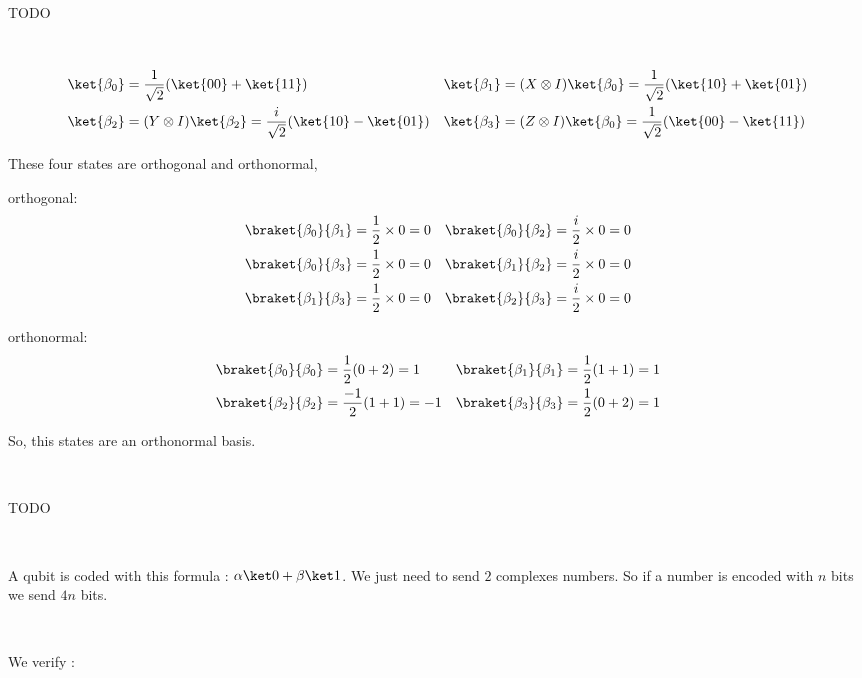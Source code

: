TODO

~

\begin{align*}
  \ket{\beta_0} &= \frac{1}{\sqrt 2}(\ket{00} + \ket{11})
  &\ket{\beta_1} &= (X \otimes I)\ket{\beta_0} =
    \frac{1}{\sqrt 2}(\ket{10}+\ket{01}) \\
  \ket{\beta_2} &= (Y \otimes I)\ket{\beta_2} =
    \frac{i}{\sqrt 2}(\ket{10} - \ket{01})
  &\ket{\beta_3} &= (Z \otimes I)\ket{\beta_0} =
    \frac{1}{\sqrt 2}(\ket{00}-\ket{11})
\end{align*}

These four states are orthogonal and orthonormal,

orthogonal:
\begin{align*}
  \braket{\beta_0}{\beta_1} &= \frac 1 2 \times 0 = 0 &
  \braket{\beta_0}{\beta_2} &= \frac i 2 \times 0 = 0 \\
  \braket{\beta_0}{\beta_3} &= \frac 1 2 \times 0 = 0 &
  \braket{\beta_1}{\beta_2} &= \frac i 2 \times 0 = 0 \\
  \braket{\beta_1}{\beta_3} &= \frac 1 2 \times 0 = 0 &
  \braket{\beta_2}{\beta_3} &= \frac i 2 \times 0 = 0
\end{align*}

orthonormal:
\begin{align*}
  \braket{\beta_0}{\beta_0} &= \frac 1 2 (0 + 2) = 1 &
  \braket{\beta_1}{\beta_1} &= \frac 1 2 (1 + 1) = 1 \\
  \braket{\beta_2}{\beta_2} &= \frac{-1}{2} (1 + 1) = -1 &
  \braket{\beta_3}{\beta_3} &= \frac 1 2 (0 + 2) = 1 \\
\end{align*}

So, this states are an orthonormal basis.

~

TODO

~

A qubit is coded with this formula : $\alpha \ket 0 + \beta \ket 1$.
We just need to send $2$ complexes numbers. So if a number is encoded with $n$
bits we send $4n$ bits.


\exo[Teleportation]~

We verify :

